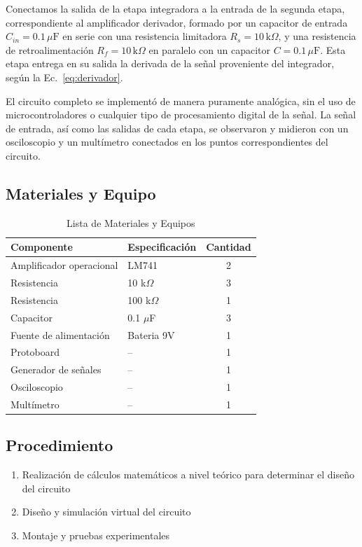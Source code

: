 \documentclass[conference]{IEEEtran}
\begin{document}
Conectamos la salida de la etapa integradora a la entrada de la segunda etapa, correspondiente al amplificador derivador, formado por un capacitor de entrada $C_{in}=0.1\,\mu\text{F}$ en serie con una resistencia limitadora $R_s=10\,\text{k}\Omega$, y una resistencia de retroalimentación $R_f=10\,\text{k}\Omega$ en paralelo con un capacitor $C=0.1\,\mu\text{F}$. Esta etapa entrega en su salida la derivada de la señal proveniente del integrador, según la Ec.~\eqref{eq:derivador}.

El circuito completo se implementó de manera puramente analógica, sin el uso de microcontroladores o cualquier tipo de procesamiento digital de la señal. La señal de entrada, así como las salidas de cada etapa, se observaron y midieron con un osciloscopio y un multímetro conectados en los puntos correspondientes del circuito.

\subsection{Materiales y Equipo}
\begin{table}[htbp]
\caption{Lista de Materiales y Equipos}
\label{tab:materiales}
\centering
\begin{tabular}{l l c}
\hline
\textbf{Componente} & \textbf{Especificación} & \textbf{Cantidad} \\
\hline
Amplificador operacional & LM741 & 2 \\
Resistencia & 10 k$\Omega$ & 3 \\
Resistencia & 100 k$\Omega$ & 1 \\
Capacitor & 0.1 $\mu$F & 3 \\
Fuente de alimentación & Bateria 9V & 1 \\
Protoboard & -- & 1 \\
Generador de señales & -- & 1 \\
Osciloscopio & -- & 1 \\
Multímetro & -- & 1 \\
\hline
\end{tabular}
\end{table}

\subsection{Procedimiento}
\begin{enumerate}
    \item Realización de cálculos matemáticos a nivel teórico para determinar el diseño del circuito
    \item Diseño y simulación virtual del circuito
    \item Montaje y pruebas experimentales
\end{enumerate}
\end{document}
